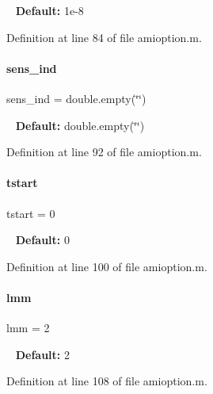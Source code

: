 ~\newline
{\bfseries Default\+:} 1e-\/8 

Definition at line 84 of file amioption.\+m.

\mbox{\label{classamioption_a0505783cf66f362672cbe3320d47a94d}} 
\paragraph{\texorpdfstring{sens\+\_\+ind}{sens\_ind}}
{\footnotesize\ttfamily sens\+\_\+ind = double.\+empty(\char`\"{}\char`\"{})}

~\newline
{\bfseries Default\+:} double.\+empty(\char`\"{}\char`\"{}) 

Definition at line 92 of file amioption.\+m.

\mbox{\label{classamioption_a18a69d8713604897ca9ee705d9d4fc4a}} 
\paragraph{\texorpdfstring{tstart}{tstart}}
{\footnotesize\ttfamily tstart = 0}

~\newline
{\bfseries Default\+:} 0 

Definition at line 100 of file amioption.\+m.

\mbox{\label{classamioption_a6f4b21b13e0c8c531c452c70b43fc96a}} 
\paragraph{\texorpdfstring{lmm}{lmm}}
{\footnotesize\ttfamily lmm = 2}

~\newline
{\bfseries Default\+:} 2 

Definition at line 108 of file amioption.\+m.

\mbox{\label{classamioption_a1fc3ae6bd5c6a80e9b81b27fc7b7a11a}} 
